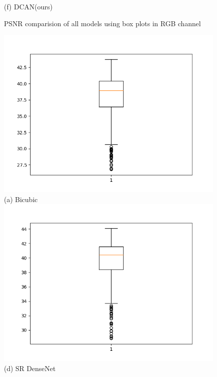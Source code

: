 \documentclass[conference]{IEEEtran}
\begin{document}
\begin{figure}[h!]
\begin{minipage}{0.3\textwidth}
  (f) DCAN(ours)
  \end{minipage}%
  \caption{PSNR comparision of all models using box plots in RGB channel}
  \label{PSNR:RGB}
  \end{figure}


\begin{figure}[h!]
  \centering
  \begin{minipage}{0.3\textwidth}
    \centering
    \includegraphics[width=\textwidth,height=0.2\textheight]{bicubic_y.png}
    (a) Bicubic
    \includegraphics[width=\textwidth,height=0.2\textheight]{dense_y (1).png}
    (d) SR DenseNet 
  \end{minipage}%
  \begin{minipage}{0.3\textwidth}

\end{minipage}
\end{figure}
\end{document}
